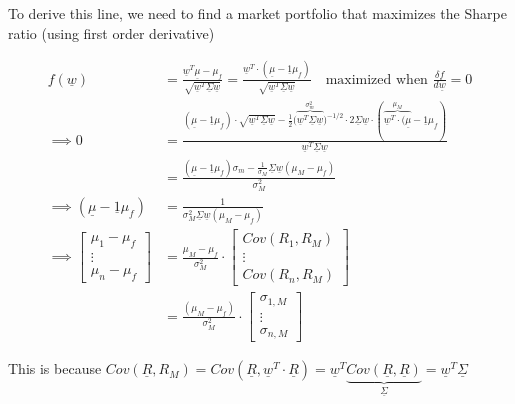 \documentclass[
  oneside]{book}
\begin{document}
To derive this line, we need to find a market portfolio that maximizes the Sharpe ratio (using first order derivative)

\[
\begin{aligned}
f(\underline{w}) &= \frac{\underline{w}^{T}\underline{\mu}-\mu_{f}}{\sqrt{ \underline{w}^{T}\underline{\Sigma}\underline{w} }} = \frac{\underline{w}^{T}\cdot (\underline{\mu}-\underline{1}\mu_{f})}{\sqrt{ \underline{w}^{T}\underline{\Sigma}\underline{w} }} \quad \text{maximized when } \frac{\delta f}{d\underline{w}} = 0\\
\implies 0 &= \frac{(\underline{\mu}-\underline{1}\mu_{f})\cdot\sqrt{ \underline{w}^{T}\underline{\Sigma}\underline{w} } - \frac{1}{2}{(\overbrace{ \underline{w}^{T}\underline{\Sigma}\underline{w}}^{ \sigma_{m}^{2} }})^{-1/2}\cdot 2\underline{\Sigma}\underline{w}\cdot (\overbrace{ \underline{w}^{T}\cdot (\underline{\mu} }^{ \mu_{M} }-\underline{1}\mu_{f})}{\underline{w}^{T}\underline{\Sigma}\underline{w}}\\
&= \frac{(\underline{\mu}-\underline{1}\mu_{f})\sigma_{m}-\frac{1}{\sigma_{M}}\underline{\Sigma}\underline{w}(\mu_{M}-\mu_{f})}{\sigma_{M}^{2}}\\
\implies (\underline{\mu}-\underline{1}\mu_{f}) &= \frac{1}{\sigma_{M}^{2}\underline{\Sigma}\underline{w}(\mu_{M}-\mu_{f})}\\
\implies \left[ \begin{array}{c}
\mu_{1}-\mu_{f} \\
\vdots \\
\mu_{n}-\mu_{f}
\end{array}  \right] 
&= \frac{\mu_{M}-\mu_{f}}{\sigma_{M}^{2}}\cdot 
\left[ \begin{array}{c}
Cov(R_{1},R_{M}) \\
\vdots \\
Cov(R_{n},R_{M})
\end{array} \right] \\
&= \frac{(\mu_{M}-\mu_{f})}{\sigma_{M}^{2}}\cdot \left[ \begin{array}{c}
\sigma_{1,M} \\
\vdots \\
\sigma_{n,M}
\end{array} \right] 
\end{aligned}
\]

This is because \(Cov(\underline{R}, R_{M}) = Cov(\underline{R},\underline{w}^{T}\cdot \underline{R}) = \underline{w}^{T}\underbrace{ Cov(\underline{R},\underline{R}) }_{ \underline{\Sigma} } = \underline{w}^{T}\underline{\Sigma}\)
\end{document}
